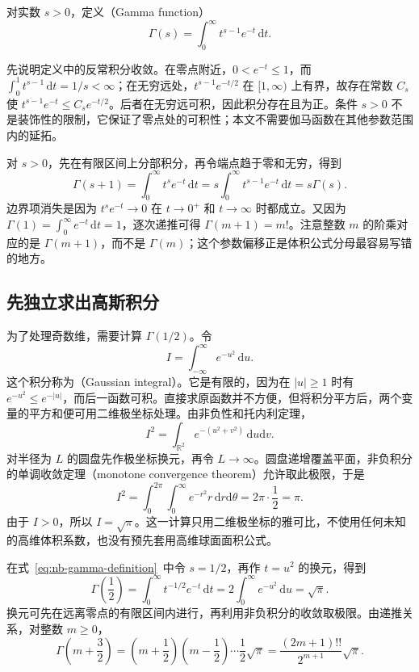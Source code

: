\documentclass[UTF8]{ctexart}
\begin{document}
\begin{definition}[伽马函数]
对实数 $s>0$，定义（Gamma function）
\begin{equation}\label{eq:nb-gamma-definition}
  \Gamma(s)=\int_0^\infty t^{s-1}e^{-t}\,\mathrm dt.
\end{equation}
\end{definition}

先说明定义中的反常积分收敛。在零点附近，$0<e^{-t}\leq1$，而 $\int_0^1t^{s-1}\,\mathrm dt=1/s<\infty$；在无穷远处，$t^{s-1}e^{-t/2}$ 在 $[1,\infty)$ 上有界，故存在常数 $C_s$ 使 $t^{s-1}e^{-t}\leq C_se^{-t/2}$。后者在无穷远可积，因此积分存在且为正。条件 $s>0$ 不是装饰性的限制，它保证了零点处的可积性；本文不需要伽马函数在其他参数范围内的延拓。

对 $s>0$，先在有限区间上分部积分，再令端点趋于零和无穷，得到
\begin{equation}\label{eq:nb-gamma-recurrence}
  \Gamma(s+1)=\int_0^\infty t^se^{-t}\,\mathrm dt
  =s\int_0^\infty t^{s-1}e^{-t}\,\mathrm dt=s\Gamma(s).
\end{equation}
边界项消失是因为 $t^se^{-t}\to0$ 在 $t\to0^+$ 和 $t\to\infty$ 时都成立。又因为 $\Gamma(1)=\int_0^\infty e^{-t}\,\mathrm dt=1$，逐次递推可得 $\Gamma(m+1)=m!$。注意整数 $m$ 的阶乘对应的是 $\Gamma(m+1)$，而不是 $\Gamma(m)$；这个参数偏移正是体积公式分母最容易写错的地方。

\subsection{先独立求出高斯积分}
\label{subsec:nb-gaussian-one}

为了处理奇数维，需要计算 $\Gamma(1/2)$。令
\[
  I=\int_{-\infty}^{\infty}e^{-u^2}\,\mathrm du.
\]
这个积分称为（Gaussian integral）。它是有限的，因为在 $|u|\geq1$ 时有 $e^{-u^2}\leq e^{-|u|}$，而后一函数可积。直接求原函数并不方便，但将积分平方后，两个变量的平方和便可用二维极坐标处理。由非负性和托内利定理，
\[
  I^2=\int_{\mathbb R^2}e^{-(u^2+v^2)}\,\mathrm du\mathrm dv.
\]
对半径为 $L$ 的圆盘先作极坐标换元，再令 $L\to\infty$。圆盘递增覆盖平面，非负积分的单调收敛定理（monotone convergence theorem）允许取此极限，于是
\[
  I^2=\int_0^{2\pi}\int_0^\infty e^{-r^2}r\,\mathrm dr\mathrm d\theta
  =2\pi\cdot\frac12=\pi.
\]
由于 $I>0$，所以 $I=\sqrt\pi$。这一计算只用二维极坐标的雅可比，不使用任何未知的高维体积系数，也没有预先套用高维球面面积公式。

在式~\eqref{eq:nb-gamma-definition}~中令 $s=1/2$，再作 $t=u^2$ 的换元，得到
\[
  \Gamma\!\left(\frac12\right)
  =\int_0^\infty t^{-1/2}e^{-t}\,\mathrm dt
  =2\int_0^\infty e^{-u^2}\,\mathrm du=\sqrt\pi.
\]
换元可先在远离零点的有限区间内进行，再利用非负积分的收敛取极限。由递推关系，对整数 $m\geq0$，
\begin{equation}\label{eq:nb-half-gamma}
  \Gamma\!\left(m+\frac32\right)
  =\left(m+\frac12\right)\left(m-\frac12\right)\cdots\frac12\sqrt\pi
  =\frac{(2m+1)!!}{2^{m+1}}\sqrt\pi.
\end{equation}
\end{document}
